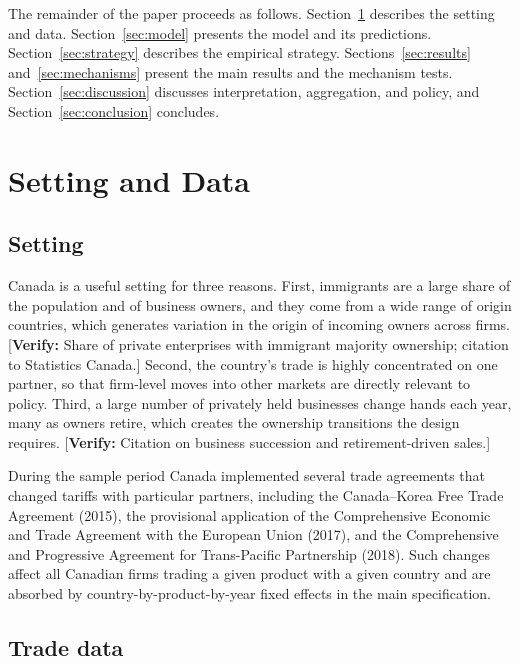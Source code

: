 \documentclass[12pt]{article}
\theoremstyle{remark}
\newcommand{\verify}[1]{\textcolor{BrickRed}{[\textbf{Verify:} #1]}}
\begin{document}
The remainder of the paper proceeds as follows. Section~\ref{sec:data}
describes the setting and data. Section~\ref{sec:model} presents the model and
its predictions. Section~\ref{sec:strategy} describes the empirical strategy.
Sections~\ref{sec:results} and~\ref{sec:mechanisms} present the main results
and the mechanism tests. Section~\ref{sec:discussion} discusses
interpretation, aggregation, and policy, and Section~\ref{sec:conclusion}
concludes.

\section{Setting and Data}
\label{sec:data}

\subsection{Setting}

Canada is a useful setting for three reasons. First, immigrants are a large
share of the population and of business owners, and they come from a wide
range of origin countries, which generates variation in the origin of
incoming owners across firms. \verify{Share of private enterprises with
immigrant majority ownership; citation to Statistics Canada.} Second, the
country's trade is highly concentrated on one partner, so that firm-level
moves into other markets are directly relevant to policy. Third, a large
number of privately held businesses change hands each year, many as owners
retire, which creates the ownership transitions the design requires.
\verify{Citation on business succession and retirement-driven sales.}

During the sample period Canada implemented several trade agreements that
changed tariffs with particular partners, including the Canada--Korea Free
Trade Agreement (2015), the provisional application of the Comprehensive
Economic and Trade Agreement with the European Union (2017), and the
Comprehensive and Progressive Agreement for Trans-Pacific Partnership (2018).
Such changes affect all Canadian firms trading a given product with a given
country and are absorbed by country-by-product-by-year fixed effects in the
main specification.

\subsection{Trade data}
\end{document}
